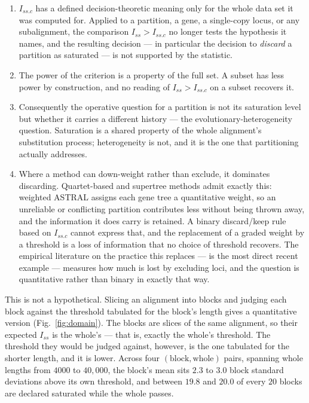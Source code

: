 \documentclass[preprint,12pt,authoryear]{elsarticle}
\newcommand{\Iss}{I_{ss}}
\newcommand{\Issc}{I_{ss.c}}
\theoremstyle{definition}
\theoremstyle{remark}
\begin{document}
\begin{enumerate}
\item[(i)] $\Issc$ has a defined decision-theoretic meaning only for the
  whole data set it was computed for. Applied to a partition, a gene, a
  single-copy locus, or any subalignment, the comparison $\Iss>\Issc$ no
  longer tests the hypothesis it names, and the resulting decision --- in
  particular the decision to \emph{discard} a partition as saturated --- is
  not supported by the statistic.
\item[(ii)] The power of the criterion is a property of the full set. A
  subset has less power by construction, and no reading of $\Iss>\Issc$ on a
  subset recovers it.
\item[(iii)] Consequently the operative question for a partition is not its
  saturation level but whether it carries a different history --- the
  evolutionary-heterogeneity question. Saturation is a shared property of the
  whole alignment's substitution process; heterogeneity is not, and it is the
  one that partitioning actually addresses.
\item[(iv)] Where a method can down-weight rather than exclude, it dominates
  discarding. Quartet-based and supertree methods admit exactly this:
  weighted ASTRAL \citep{zhang2018} assigns each gene tree a quantitative
  weight, so an unreliable or conflicting partition contributes less without
  being thrown away, and the information it does carry is retained. A binary
  discard/keep rule based on $\Issc$ cannot express that, and the replacement
  of a graded weight by a threshold is a loss of information that no choice
  of threshold recovers. The empirical literature on the practice this
  replaces --- \citet{duchene2022saturation} is the most direct recent
  example --- measures how much is lost by excluding loci, and the question
  is quantitative rather than binary in exactly that way.
\end{enumerate}

This is not a hypothetical. Slicing an alignment into blocks and judging each
block against the threshold tabulated for the block's length gives a
quantitative version (Fig.~\ref{fig:domain}). The blocks are slices of the
same alignment, so their expected $\Iss$ is the whole's --- that is, exactly
the whole's threshold. The threshold they would be judged against, however,
is the one tabulated for the shorter length, and it is lower. Across four
$(\text{block},\text{whole})$ pairs, spanning whole lengths from $4000$ to
$40{,}000$, the block's mean sits $2.3$ to $3.0$ block standard deviations
above its own threshold, and between $19.8$ and $20.0$ of every $20$ blocks
are declared saturated while the whole passes.
\end{document}
